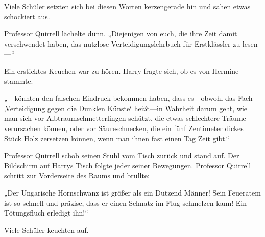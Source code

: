 Viele Schüler setzten sich bei diesen Worten kerzengerade hin und sahen etwas schockiert aus.

Professor Quirrell lächelte dünn. „Diejenigen von euch, die ihre Zeit damit verschwendet haben, das nutzlose Verteidigungslehrbuch für Erstklässler zu lesen—“

Ein ersticktes Keuchen war zu hören. Harry fragte sich, ob es von Hermine stammte.

„—könnten den falschen Eindruck bekommen haben, dass es—obwohl das Fach ‚Verteidigung gegen die Dunklen Künste‘ heißt—in Wahrheit darum geht, wie man sich vor Albtraumschmetterlingen schützt, die etwas schlechtere Träume verursachen können, oder vor Säureschnecken, die ein fünf Zentimeter dickes Stück Holz zersetzen können, wenn man ihnen fast einen Tag Zeit gibt.“

Professor Quirrell schob seinen Stuhl vom Tisch zurück und stand auf. Der Bildschirm auf Harrys Tisch folgte jeder seiner Bewegungen. Professor Quirrell schritt zur Vorderseite des Raums und brüllte:

„Der Ungarische Hornschwanz ist größer als ein Dutzend Männer! Sein Feueratem ist so schnell und präzise, dass er einen Schnatz im Flug schmelzen kann! Ein Tötungsfluch erledigt ihn!“

Viele Schüler keuchten auf.

